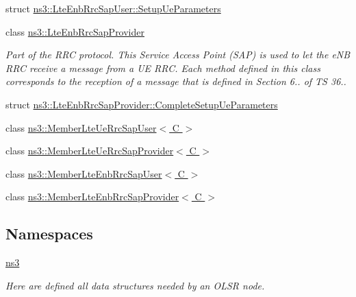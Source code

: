 \begin{DoxyCompactItemize}
struct \hyperlink{structns3_1_1LteEnbRrcSapUser_1_1SetupUeParameters}{ns3\+::\+Lte\+Enb\+Rrc\+Sap\+User\+::\+Setup\+Ue\+Parameters}
\item 
class \hyperlink{classns3_1_1LteEnbRrcSapProvider}{ns3\+::\+Lte\+Enb\+Rrc\+Sap\+Provider}
\begin{DoxyCompactList}\small\item\em Part of the R\+RC protocol. This Service Access Point (S\+AP) is used to let the e\+NB R\+RC receive a message from a UE R\+RC. Each method defined in this class corresponds to the reception of a message that is defined in Section 6.. of TS 36.. \end{DoxyCompactList}\item 
struct \hyperlink{structns3_1_1LteEnbRrcSapProvider_1_1CompleteSetupUeParameters}{ns3\+::\+Lte\+Enb\+Rrc\+Sap\+Provider\+::\+Complete\+Setup\+Ue\+Parameters}
\item 
class \hyperlink{classns3_1_1MemberLteUeRrcSapUser}{ns3\+::\+Member\+Lte\+Ue\+Rrc\+Sap\+User$<$ C $>$}
\item 
class \hyperlink{classns3_1_1MemberLteUeRrcSapProvider}{ns3\+::\+Member\+Lte\+Ue\+Rrc\+Sap\+Provider$<$ C $>$}
\item 
class \hyperlink{classns3_1_1MemberLteEnbRrcSapUser}{ns3\+::\+Member\+Lte\+Enb\+Rrc\+Sap\+User$<$ C $>$}
\item 
class \hyperlink{classns3_1_1MemberLteEnbRrcSapProvider}{ns3\+::\+Member\+Lte\+Enb\+Rrc\+Sap\+Provider$<$ C $>$}
\end{DoxyCompactItemize}
\subsection*{Namespaces}
\begin{DoxyCompactItemize}
\item 
 \hyperlink{namespacens3}{ns3}
\begin{DoxyCompactList}\small\item\em Here are defined all data structures needed by an O\+L\+SR node. \end{DoxyCompactList}\end{DoxyCompactItemize}
